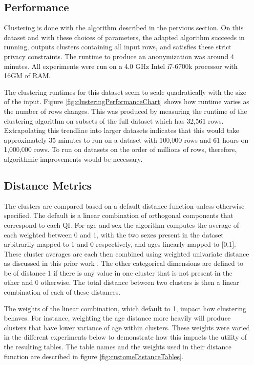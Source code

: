 \subsection{Performance}
Clustering is done with the algorithm described in the pervious section. On this dataset and with these choices of parameters, the adapted algorithm succeeds in running, outputs clusters containing all input rows, and satisfies these strict privacy constraints. The runtime to produce an anonymization was around 4 minutes. All experiments were run on a 4.0 GHz Intel i7-6700k processor with 16GM of RAM. 

The clustering runtimes for this dataset seem to scale quadratically with the size of the input. Figure \ref{fig:clusteringPerformanceChart} shows how runtime varies as the number of rows changes. This was produced by measuring the runtime of the clustering algorithm on subsets of the full dataset which has 32,561 rows. Extrapolating this trendline into larger datasets indicates that this would take approximately 35 minutes to run on a dataset with 100,000 rows and 61 hours on 1,000,000 rows. To run on datasets on the order of millions of rows, therefore, algorithmic improvements would be necessary.

\begin{figure*}
  \centering
  
  \caption{Clustering Performance}
  \label{fig:clusteringPerformanceChart}
\end{figure*}

\subsection{Distance Metrics}
The clusters are compared based on a default distance function unless otherwise specified. The default is a linear combination of orthogonal components that correspond to each QI. For age and sex the algorithm computes the average of each weighted between 0 and 1, with the two sexes present in the dataset arbitrarily mapped to 1 and 0 respectively, and ages linearly mapped to [0,1]. These cluster averages are each then combined using weighted univariate distance as discussed in this prior work \cite{domingoPracticalCluster}. The other categorical dimensions are defined to be of distance 1 if there is any value in one cluster that is not present in the other and 0 otherwise. The total distance between two clusters is then a linear combination of each of these distances.

The weights of the linear combination, which default to 1, impact how clustering behaves. For instance, weighting the age distance more heavily will produce clusters that have lower variance of age within clusters. These weights were varied in the different experiments below to demonstrate how this impacts the utility of the resulting tables. The table names and the weights used in their distance function are described in figure \ref{fig:customeDistanceTables}.

